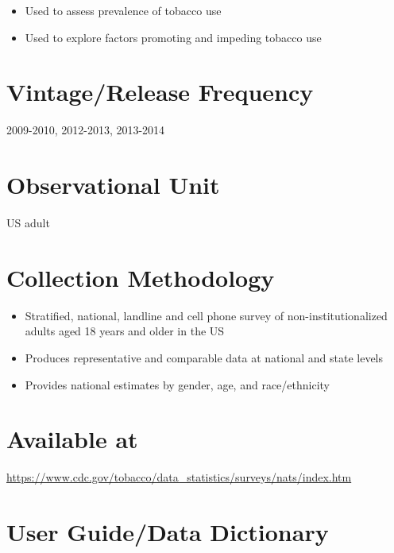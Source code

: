 \documentclass[
]{book}
\providecommand{\tightlist}{%
  \setlength{\itemsep}{0pt}\setlength{\parskip}{0pt}}
\begin{document}
\begin{itemize}
\tightlist
\item
  Used to assess prevalence of tobacco use
\item
  Used to explore factors promoting and impeding tobacco use
\end{itemize}

\hypertarget{vintagerelease-frequency-42}{%
\section{Vintage/Release Frequency}\label{vintagerelease-frequency-42}}

2009-2010, 2012-2013, 2013-2014

\hypertarget{observational-unit-42}{%
\section{Observational Unit}\label{observational-unit-42}}

US adult

\hypertarget{collection-methodology-42}{%
\section{Collection Methodology}\label{collection-methodology-42}}

\begin{itemize}
\tightlist
\item
  Stratified, national, landline and cell phone survey of non-institutionalized adults aged 18 years and older in the US
\item
  Produces representative and comparable data at national and state levels
\item
  Provides national estimates by gender, age, and race/ethnicity
\end{itemize}

\hypertarget{available-at-42}{%
\section{Available at}\label{available-at-42}}

\url{https://www.cdc.gov/tobacco/data_statistics/surveys/nats/index.htm}

\hypertarget{user-guidedata-dictionary-42}{%
\section{User Guide/Data Dictionary}\label{user-guidedata-dictionary-42}}
\end{document}
